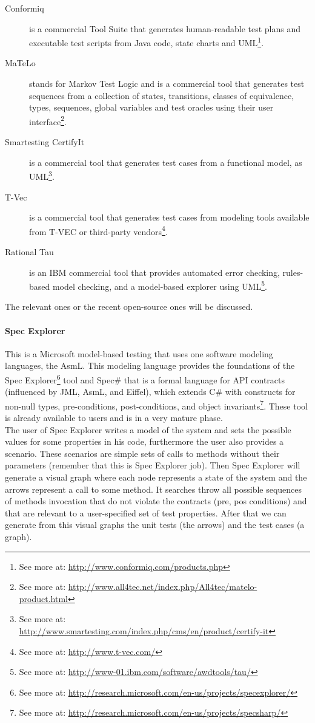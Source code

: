 \begin{description}
\item[Conformiq] is a commercial Tool Suite that generates
human-readable test plans and executable test scripts from Java code, state charts and \ac{UML}\footnote{See more at: \url{http://www.conformiq.com/products.php}}.
\item[MaTeLo] stands for Markov Test Logic and is a commercial tool
that generates test sequences from a collection of states, transitions, classes of equivalence, types, sequences, global variables and test oracles
using their user interface\footnote{See more at: \url{http://www.all4tec.net/index.php/All4tec/matelo-product.html}}.
\item[Smartesting CertifyIt] is a commercial tool that generates test cases from a functional model, as \ac{UML}\footnote{See more at: \url{http://www.smartesting.com/index.php/cms/en/product/certify-it}}.
\item[T-Vec] is a commercial tool that generates test cases from modeling tools available from T-VEC or third-party vendors\footnote{See more at: \url{http://www.t-vec.com/}}.
\item[Rational Tau] is an \ac{IBM} commercial tool that provides automated error checking, rules-based model checking, and a model-based explorer using
\ac{UML}\footnote{See more at: \url{http://www-01.ibm.com/software/awdtools/tau/}}.
\end{description}
The relevant ones or the recent open-source ones will be discussed.

\paragraph{Spec Explorer}
This is a Microsoft model-based testing that uses one software modeling languages, the \ac{AsmL}.
This modeling language provides the foundations of the Spec Explorer\footnote{See more at: \url{http://research.microsoft.com/en-us/projects/specexplorer/}} tool
and Spec\# that is a formal language for \ac{API} contracts (influenced by \ac{JML}, \ac{AsmL}, and Eiffel), which extends C\# with constructs for non-null types,
pre-conditions, post-conditions, and object invariants\footnote{See more at: \url{http://research.microsoft.com/en-us/projects/specsharp/}}.
These tool is already available to users and is in a very mature phase.\\
\indent The user of Spec Explorer writes a model of the system and sets the possible values for some properties in his code, furthermore the user also provides a scenario.
These scenarios are simple sets of calls to methods without their parameters (remember that this is Spec Explorer job).
Then Spec Explorer will generate a visual graph where each node represents a state of the system and the arrows represent a call to some method.
It searches throw all possible sequences of methods invocation that do not violate the contracts (pre, pos conditions) and
that are relevant to a user-specified set of test properties. After that we can generate from this visual graphs the unit tests (the arrows) and the
test cases (a graph).

